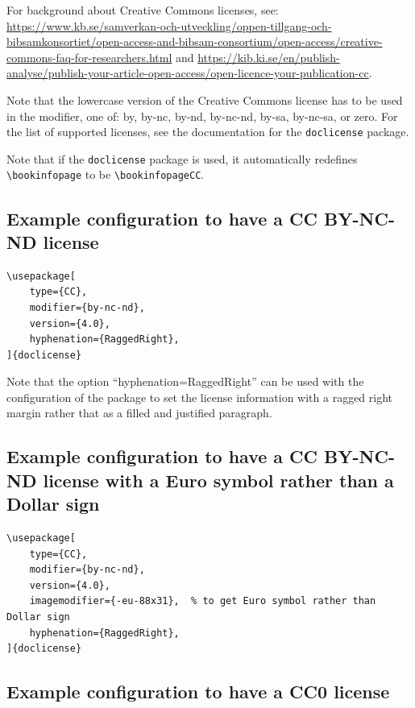\documentclass[examplethesis.tex]{subfiles}
\begin{document}
For background about Creative Commons licenses, see:
\url{https://www.kb.se/samverkan-och-utveckling/oppen-tillgang-och-bibsamkonsortiet/open-access-and-bibsam-consortium/open-access/creative-commons-faq-for-researchers.html} and \url{https://kib.ki.se/en/publish-analyse/publish-your-article-open-access/open-licence-your-publication-cc}.

Note that the lowercase version of the Creative Commons license has to be used in the modifier, \ie one of: by, by-nc, by-nd, by-nc-nd, by-sa, by-nc-sa, or zero. For the list of supported licenses, see the documentation for the \texttt{doclicense} package.

Note that if the \texttt{doclicense} package is used, it automatically redefines \texttt{\textbackslash bookinfopage} to be \texttt{\textbackslash bookinfopageCC}.

\subsection{Example configuration to have a CC BY-NC-ND license}

\begin{lstlisting}[style=latexExampleForAuthors]
\usepackage[
    type={CC},
    modifier={by-nc-nd},
    version={4.0},
    hyphenation={RaggedRight},
]{doclicense}
\end{lstlisting}

Note that the option ``hyphenation={RaggedRight}'' can be used with the configuration of the package to set the license information with a ragged right margin rather that as a filled and justified paragraph.


\subsection{Example configuration to have a CC BY-NC-ND license with a Euro symbol rather than a Dollar sign}

\begin{lstlisting}[style=latexExampleForAuthors]
\usepackage[
    type={CC},
    modifier={by-nc-nd},
    version={4.0},
    imagemodifier={-eu-88x31},  % to get Euro symbol rather than Dollar sign
    hyphenation={RaggedRight},
]{doclicense}
\end{lstlisting}


\subsection{Example configuration to have a CC0 license}
\end{document}
